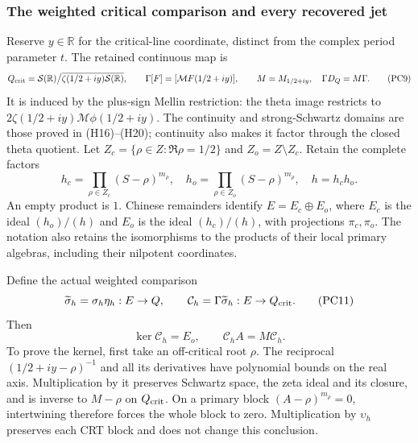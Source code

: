 \subsubsection{The weighted critical comparison and every recovered jet}

Reserve $y\in\mathbb R$ for the critical-line coordinate, distinct
from the complex period parameter $t$.  The retained continuous map is
\[
 Q_{\rm crit}=\mathcal S(\mathbb R)\big/
   \overline{\zeta(1/2+iy)\mathcal S(\mathbb R)},\qquad
 \Gamma[F]=[\mathcal MF(1/2+iy)],\qquad
 M=M_{1/2+iy},\quad \Gamma D_Q=M\Gamma.
 \tag{PC9}
\]
It is induced by the plus-sign Mellin restriction: the theta image
restricts to $2\zeta(1/2+iy)\mathcal M\phi(1/2+iy)$.
The continuity and strong-Schwartz domains are those proved in
(H16)--(H20); continuity also makes it factor through the closed
theta quotient.  Let $Z_c=\{\rho\in Z:\Re\rho=1/2\}$ and
$Z_o=Z\setminus Z_c$.  Retain the complete factors
\[
 h_c=\prod_{\rho\in Z_c}(S-\rho)^{m_\rho},\quad
 h_o=\prod_{\rho\in Z_o}(S-\rho)^{m_\rho},\quad h=h_ch_o.
 \tag{PC10}
\]
An empty product is $1$.  Chinese remainders identify
$E=E_c\oplus E_o$, where $E_c$ is the ideal $(h_o)/(h)$ and
$E_o$ is the ideal $(h_c)/(h)$, with projections $\pi_c,\pi_o$.
The notation also retains the isomorphisms to the products of their
local primary algebras, including their nilpotent coordinates.

Define the actual weighted comparison
\[
 \widetilde\sigma_h=\sigma_h\eta_h:E\to Q,\qquad
 \mathcal C_h=\Gamma\widetilde\sigma_h:E\to Q_{\rm crit}.
 \tag{PC11}
\]
Then
\[
 \boxed{\ker\mathcal C_h=E_o,\qquad
         \mathcal C_hA=M\mathcal C_h.}
 \tag{PC12}
\]
To prove the kernel, first take an off-critical root $\rho$.
The reciprocal $(1/2+iy-\rho)^{-1}$ and all its derivatives have
polynomial bounds on the real axis.  Multiplication by it preserves
Schwartz space, the zeta ideal and its closure, and is inverse to
$M-\rho$ on $Q_{\rm crit}$.  On a primary block
$(A-\rho)^{m_\rho}=0$, intertwining therefore forces the whole
block to zero.  Multiplication by $\upsilon_h$ preserves each CRT
block and does not change this conclusion.

